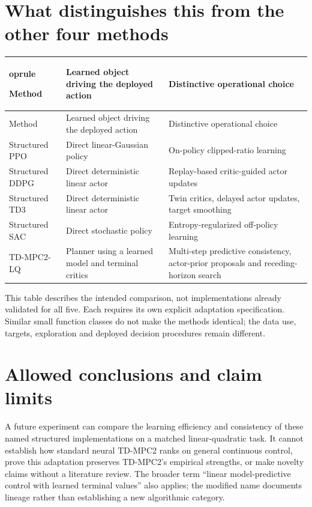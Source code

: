 \documentclass[11pt]{article}
\begin{document}
\section{What distinguishes this from the other four methods}

\begingroup\small\setlength{\tabcolsep}{4pt}\begin{longtable}{>{\raggedright\arraybackslash}p{}>{\raggedright\arraybackslash}p{}>{\raggedright\arraybackslash}p{}}	oprule

Method & Learned object driving the deployed action & Distinctive operational choice \\\midrule\endfirsthead
Method & Learned object driving the deployed action & Distinctive operational choice \\\midrule\endhead


Structured PPO & Direct linear-Gaussian policy & On-policy clipped-ratio learning \\

Structured DDPG & Direct deterministic linear actor & Replay-based critic-guided actor updates \\

Structured TD3 & Direct deterministic linear actor & Twin critics, delayed actor updates, target smoothing \\

Structured SAC & Direct stochastic policy & Entropy-regularized off-policy learning \\

TD-MPC2-LQ & Planner using a learned model and terminal critics & Multi-step predictive consistency, actor-prior proposals and receding-horizon search \\

\bottomrule\end{longtable}\endgroup

This table describes the intended comparison, not implementations already validated for all five. Each requires its own explicit adaptation specification. Similar small function classes do not make the methods identical; the data use, targets, exploration and deployed decision procedures remain different.

\section{Allowed conclusions and claim limits}

A future experiment can compare the learning efficiency and consistency of these named structured implementations on a matched linear-quadratic task. It cannot establish how standard neural TD-MPC2 ranks on general continuous control, prove this adaptation preserves TD-MPC2's empirical strengths, or make novelty claims without a literature review. The broader term “linear model-predictive control with learned terminal values” also applies; the modified name documents lineage rather than establishing a new algorithmic category.
\end{document}
